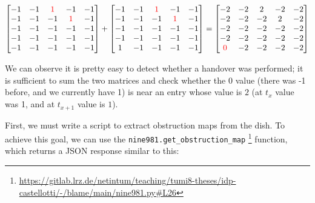 \documentclass[IN,11pt,twoside,openright,idp,english]{tumthesis}
\begin{document}
$\begin{bmatrix}
-1 & -1 & \color{red}1 &           -1 & -1 \\
-1 & -1 &           -1 & \color{red}1 & -1 \\
-1 & -1 &           -1 &           -1 & -1 \\
-1 & -1 &           -1 &           -1 & -1 \\
-1 & -1 &           -1 &           -1 & -1 \\
\end{bmatrix}
+
\begin{bmatrix}
-1 & -1 & \color{red}1 &           -1 & -1 \\
-1 & -1 &           -1 & \color{red}1 & -1 \\
-1 & -1 &           -1 &           -1 & -1 \\
-1 & -1 &           -1 &           -1 & -1 \\
1 & -1 &            -1 &           -1 & -1 \\
\end{bmatrix}
=
\begin{bmatrix}
          -2 & -2 & 2 & -2 & -2 \\
          -2 & -2 & -2 & 2 & -2 \\
          -2 & -2 & -2 & -2 & -2 \\
          -2 & -2 & -2 & -2 & -2 \\
\color{red}0 & -2 & -2 & -2 & -2 \\
\end{bmatrix}$

\vspace{10mm}

We can observe it is pretty easy to detect whether a handover was performed; it is sufficient to sum the two matrices and check whether the $ 0 $ value (there was -1 before, and we currently have 1) is near an entry whose value is $ 2 $ (at $ t_{x} $ value was 1, and at $ t_{x+1} $ value is $ 1 $). 

First, we must write a script to extract obstruction maps from the dish. To achieve this goal, we can use the \texttt{nine981.get\_obstruction\_map} \footnote{\url{https://gitlab.lrz.de/netintum/teaching/tumi8-theses/idp-castellotti/-/blame/main/nine981.py\#L26}} function, which returns a JSON response similar to this:
\end{document}
